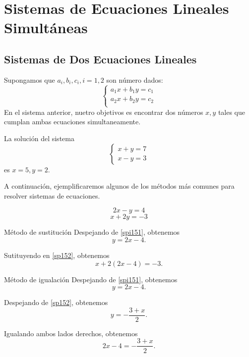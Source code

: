 
\section{Sistemas de Ecuaciones Lineales Simultáneas}

\subsection{Sistemas de Dos Ecuaciones Lineales}

 Supongamos que $a_{i}, b_{i}, c_{i}, i=1,2$ son número dados:
	$$\begin{cases}
		a_{1}x+b_{1}y=c_{1}\\
		a_{2}x+b_{2}y=c_{2}\\
	\end{cases}
	$$
	En el sistema anterior, nuetro objetivos es encontrar dos números $x,y$ tales que cumplan ambas ecuaciones simultaneamente.



	\begin{problema}
		La soluci\'on del sistema 
		$$\begin{cases}
			x+y=7\\
			x-y=3
		\end{cases}
		$$ es $x=5,y=2.$
	\end{problema}
	



	A continuaci\'on, ejemplificaremos algunos de los m\'etodos más comunes para resolver sistemas de ecuaciones.

%

\begin{equation}
	\label{spi151}
	2x-y=4
\end{equation}
\begin{equation}	
	\label{spi152}
	x+2y=-3
\end{equation}		

	


{M\'etodo de sustituci\'on} 
	Despejando de \eqref{spi151}, obtenemos
	$$y=2x-4.$$
	
	Sutituyendo en \eqref{sp152}, obtenemos
	$$
	x+2(2x-4)=-3.
	$$
	


{M\'etodo de igualaci\'on}
	Despejando de \eqref{spi151}, obtenemos
	$$y=2x-4.$$
	
	Despejando de \eqref{sp152}, obtenemos
	$$y=-\dfrac{3+x}{2}.$$
	
	Igualando ambos lados derechos, obtenemos
	$$
	2x-4=-\dfrac{3+x}{2}.
	$$



